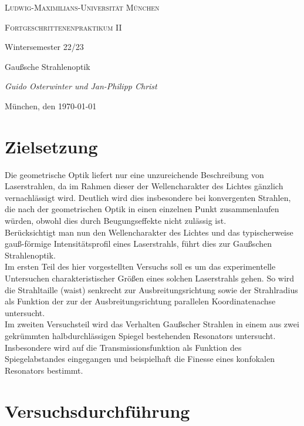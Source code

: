 \documentclass[11pt,a4paper,oneside]{scrartcl}
\begin{document}
\begin{titlepage}
	\centering
	{\scshape\LARGE Ludwig-Maximilians-Universität \linebreak München \par}
	\vspace{1cm}
	{\scshape\Large Fortgeschrittenenpraktikum II \par Wintersemester 22/23 \par}
	\vspace{1.5cm}
	{\huge\bfseries \par  Gaußsche Strahlenoptik\par}
	\vspace{2cm}
	{\Large\itshape Guido Osterwinter und Jan-Philipp Christ \par}
	\vfill
	{\large München, den \today\par}
\end{titlepage}

\tableofcontents
\newpage
\section{Zielsetzung}
Die geometrische Optik liefert nur eine unzureichende Beschreibung von Laserstrahlen, da im Rahmen dieser der Wellencharakter des Lichtes gänzlich vernachlässigt wird. Deutlich wird dies insbesondere bei konvergenten Strahlen, die nach der geometrischen Optik in einen einzelnen Punkt zusammenlaufen würden, obwohl dies durch Beugungseffekte nicht zulässig ist. \\
Berücksichtigt man nun den Wellencharakter des Lichtes und das typischerweise gauß-förmige Intensitätsprofil eines Laserstrahls, führt dies zur Gaußschen Strahlenoptik. \\
Im ersten Teil des hier vorgestellten Versuchs soll es um das experimentelle Untersuchen charakteristischer Größen eines solchen Laserstrahls gehen. So wird die Strahltaille (waist) senkrecht zur Ausbreitungsrichtung sowie der Strahlradius als Funktion der zur der Ausbreitungsrichtung parallelen Koordinatenachse untersucht.\\
Im zweiten Versuchsteil wird das Verhalten Gaußscher Strahlen in einem aus zwei gekrümmten halbdurchlässigen Spiegel bestehenden Resonators untersucht. Insbesondere wird auf die Transmissionsfunktion als Funktion des Spiegelabstandes eingegangen und beispielhaft die Finesse eines konfokalen Resonators bestimmt. 
\section{Versuchsdurchführung}
\end{document}
